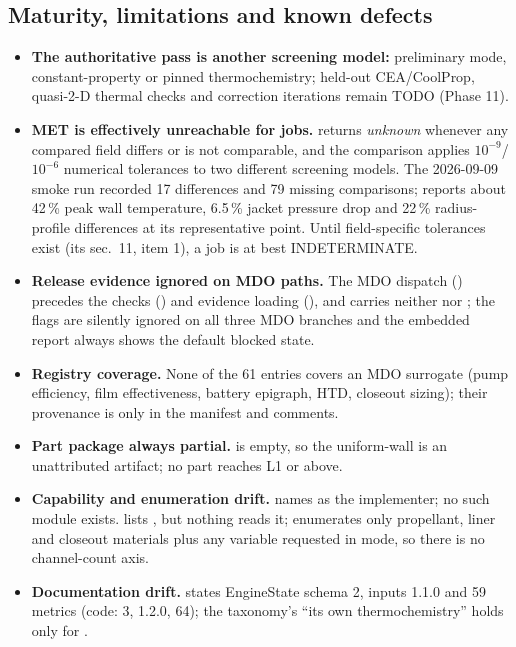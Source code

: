 \subsection{Maturity, limitations and known defects}\label{sec:s14-limits}
\begin{itemize}
\item \textbf{The authoritative pass is another screening model:} preliminary mode, constant-property or pinned thermochemistry; held-out CEA/CoolProp, quasi-2-D thermal checks and correction iterations remain TODO (Phase 11).
\item \textbf{MET is effectively unreachable for jobs.}  returns \emph{unknown} whenever any compared field differs or is not comparable, and the comparison applies $10^{-9}$/$10^{-6}$ numerical tolerances to two different screening models. The 2026-09-09 smoke run recorded 17 differences and 79 missing comparisons;  reports about 42\,\% peak wall temperature, 6.5\,\% jacket pressure drop and 22\,\% radius-profile differences at its representative point. Until field-specific tolerances exist (its sec.~11, item 1), a job is at best INDETERMINATE.
\item \textbf{Release evidence ignored on MDO paths.} The MDO dispatch () precedes the  checks () and evidence loading (), and  carries neither  nor ; the flags are silently ignored on all three MDO branches and the embedded report always shows the default blocked state.
\item \textbf{Registry coverage.} None of the 61 entries covers an MDO surrogate (pump efficiency, film effectiveness, battery epigraph, HTD, closeout sizing); their provenance is only in the manifest and comments.
\item \textbf{Part package always partial.}  is empty, so the uniform-wall  is an unattributed artifact; no part reaches L1 or above.
\item \textbf{Capability and enumeration drift.}  names  as the  implementer; no such module exists.  lists , but nothing reads it;  enumerates only propellant, liner and closeout materials plus any variable requested in  mode, so there is no channel-count axis.
\item \textbf{Documentation drift.}  states EngineState schema 2, inputs 1.1.0 and 59 metrics (code: 3, 1.2.0, 64); the taxonomy's ``its own thermochemistry'' holds only for .
\end{itemize}

